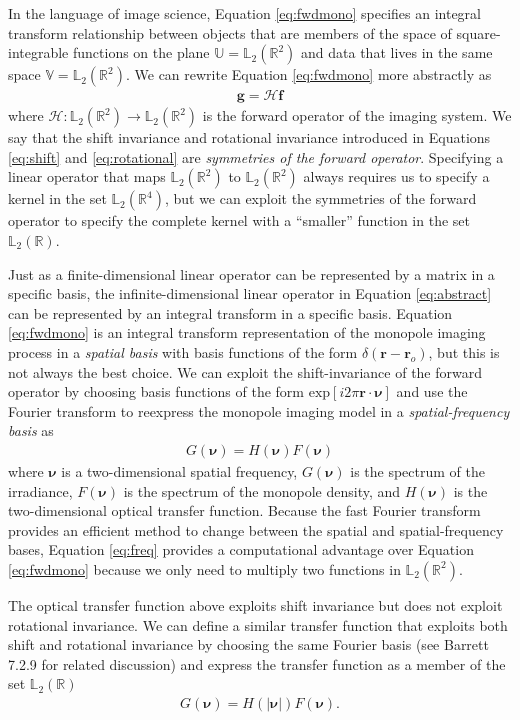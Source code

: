 \documentclass{osa-article}
\providecommand{\mb}[1]{\mathbf{#1}}
\providecommand{\mc}[1]{\mathcal{#1}}
\providecommand{\ro}{\mathbf{\mathbf{r}}_o}
\providecommand{\mbb}[1]{\mathbb{#1}}
\providecommand{\bs}[1]{\boldsymbol{#1}}
\begin{document}
In the language of image science, Equation \ref{eq:fwdmono} specifies an
integral transform relationship between objects that are members of the space of
square-integrable functions on the plane $\mbb{U} = \mbb{L}_2(\mbb{R}^2)$ and
data that lives in the same space $\mbb{V} = \mbb{L}_2(\mbb{R}^2)$. We can
rewrite Equation \ref{eq:fwdmono} more abstractly as
\begin{align}
  \mb{g} = \mc{H}\mb{f} \label{eq:abstract}
\end{align}
where $\mc{H}: \mbb{L}_2(\mbb{R}^2) \rightarrow \mbb{L}_2(\mbb{R}^2)$ is the
forward operator of the imaging system. We say that the shift invariance and
rotational invariance introduced in Equations \ref{eq:shift} and
\ref{eq:rotational} are \textit{symmetries of the forward operator}. Specifying
a linear operator that maps $\mbb{L}_2(\mbb{R}^2)$ to $\mbb{L}_2(\mbb{R}^2)$
always requires us to specify a kernel in the set $\mbb{L}_2(\mbb{R}^4)$, but we
can exploit the symmetries of the forward operator to specify the complete
kernel with a ``smaller'' function in the set $\mbb{L}_2(\mbb{R})$.

Just as a finite-dimensional linear operator can be represented by a matrix in a
specific basis, the infinite-dimensional linear operator in Equation
\ref{eq:abstract} can be represented by an integral transform in a specific
basis. Equation \ref{eq:fwdmono} is an integral transform representation of the
monopole imaging process in a \textit{spatial basis} with basis functions of the
form $\delta(\mb{r} - \ro)$, but this is not always the best choice. We can
exploit the shift-invariance of the forward operator by choosing basis functions
of the form $\text{exp}[i2\pi \mb{r}\cdot\bs{\nu}]$ and use the Fourier
transform to reexpress the monopole imaging model in a \textit{spatial-frequency
  basis} as
\begin{align}
  G(\bs{\nu}) = H(\bs{\nu})F(\bs{\nu})\label{eq:freq}
\end{align}
where $\bs{\nu}$ is a two-dimensional spatial frequency, $G(\bs{\nu})$ is the
spectrum of the irradiance, $F(\bs{\nu})$ is the spectrum of the monopole
density, and $H(\bs{\nu})$ is the two-dimensional optical transfer function.
Because the fast Fourier transform provides an efficient method to change
between the spatial and spatial-frequency bases, Equation \ref{eq:freq} provides
a computational advantage over Equation \ref{eq:fwdmono} because we only need to
multiply two functions in $\mbb{L}_2(\mbb{R}^2)$.

The optical transfer function above exploits shift invariance but does not
exploit rotational invariance. We can define a similar transfer function that
exploits both shift and rotational invariance by choosing the same Fourier basis
(see Barrett 7.2.9 for related discussion) and express the transfer function
as a member of the set $\mbb{L}_2(\mbb{R})$
\begin{align}
  G(\bs{\nu}) = H(|\bs{\nu}|)F(\bs{\nu}).\label{eq:freq2}
\end{align}
\end{document}
